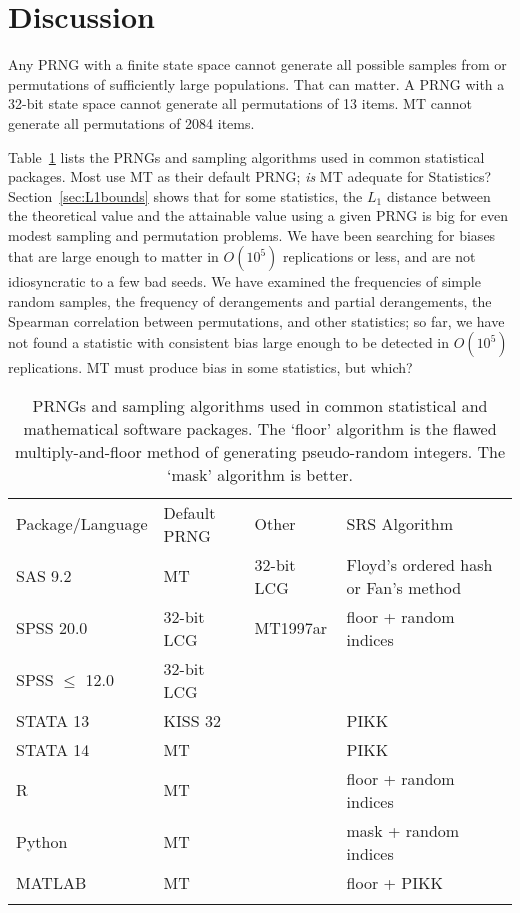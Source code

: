 \documentclass[graybox]{svmult}
\renewcommand{\arraystretch}{1}
\begin{document}
\section{Discussion}
\label{sec:discussion}

Any PRNG with a finite state space cannot generate all possible samples from or permutations of 
sufficiently large populations.
That can matter.
A PRNG with a 32-bit state space cannot generate all permutations of 13 items.
MT cannot generate all permutations of 2084 items.

Table~\ref{tab:software} lists the PRNGs and sampling algorithms used in common statistical packages.
Most use MT as their default PRNG; \emph{is} MT adequate for Statistics?
Section~\ref{sec:L1bounds} shows that for some statistics, the $L_1$ distance between the theoretical value and the attainable value using a given PRNG
 is big for even modest sampling and permutation problems.
We have been searching for biases that are large enough to matter in 
$O(10^5)$ replications or less, and are not idiosyncratic to a few bad seeds.
We have examined the frequencies of simple random samples, the frequency of derangements and partial derangements, the Spearman correlation between permutations, 
and other statistics; so far, we have not found a statistic with consistent
bias large enough to be detected in $O(10^5)$ replications.
MT must produce bias in some statistics, but which?

\renewcommand{\arraystretch}{1}

\begin{table}
\caption{PRNGs and sampling algorithms used in common statistical and mathematical software packages. The `floor' algorithm is the flawed multiply-and-floor method of generating pseudo-random integers. The `mask' algorithm is better.}
\label{tab:software}      
\begin{tabular}[h]{p{2.5cm}p{2.2cm}p{1.8cm}p{4.9cm}}
\hline\noalign{\smallskip}
Package/Language & Default PRNG & Other & SRS Algorithm  \\
\noalign{\smallskip}\svhline\noalign{\smallskip}
SAS 9.2              & MT         	& 32-bit LCG & Floyd's ordered hash or Fan's method \cite{fan_development_1962} \\
SPSS 20.0          & 32-bit LCG  & MT1997ar  & floor + random indices \\
SPSS $\le$ 12.0 & 32-bit LCG  &         &                \\
STATA 13            & KISS 32      &         & PIKK           \\
STATA 14            & MT              &         & PIKK           \\
R                         & MT              &         & floor + random indices \\
Python                 & MT             &         & mask + random indices  \\
MATLAB              & MT             &         & floor + PIKK         \\
\noalign{\smallskip}\hline\noalign{\smallskip}
\end{tabular}
\end{table}
\end{document}
